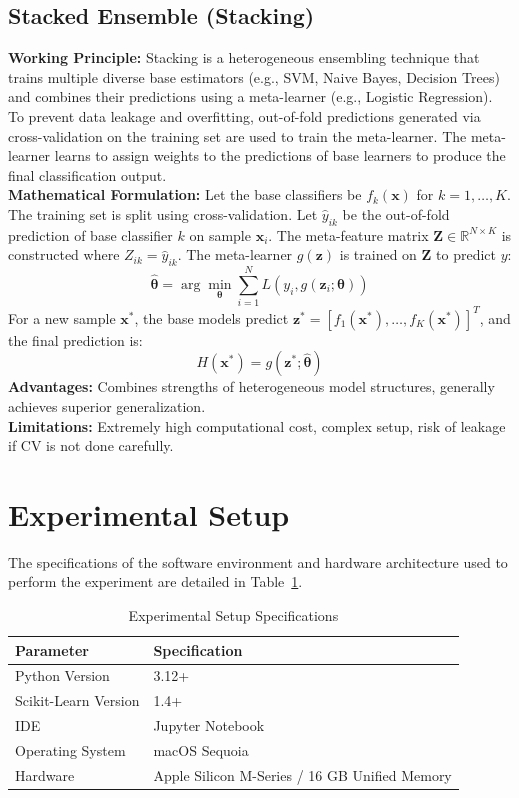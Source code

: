 \documentclass[12pt,a4paper]{article}
\begin{document}
\subsection{Stacked Ensemble (Stacking)}
\textbf{Working Principle:} Stacking is a heterogeneous ensembling technique that trains multiple diverse base estimators (e.g., SVM, Naive Bayes, Decision Trees) and combines their predictions using a meta-learner (e.g., Logistic Regression). To prevent data leakage and overfitting, out-of-fold predictions generated via cross-validation on the training set are used to train the meta-learner. The meta-learner learns to assign weights to the predictions of base learners to produce the final classification output.\\
\textbf{Mathematical Formulation:}
Let the base classifiers be $f_k(\mathbf{x})$ for $k = 1, \dots, K$. The training set is split using cross-validation. Let $\hat{y}_{ik}$ be the out-of-fold prediction of base classifier $k$ on sample $\mathbf{x}_i$. The meta-feature matrix $\mathbf{Z} \in \mathbb{R}^{N \times K}$ is constructed where $Z_{ik} = \hat{y}_{ik}$. The meta-learner $g(\mathbf{z})$ is trained on $\mathbf{Z}$ to predict $y$:
\begin{equation}
\hat{\boldsymbol{\theta}} = \arg\min_{\boldsymbol{\theta}} \sum_{i=1}^N L(y_i, g(\mathbf{z}_i; \boldsymbol{\theta}))
\end{equation}
For a new sample $\mathbf{x}^*$, the base models predict $\mathbf{z}^* = [f_1(\mathbf{x}^*), \dots, f_K(\mathbf{x}^*)]^T$, and the final prediction is:
\begin{equation}
H(\mathbf{x}^*) = g(\mathbf{z}^*; \hat{\boldsymbol{\theta}})
\end{equation}
\textbf{Advantages:} Combines strengths of heterogeneous model structures, generally achieves superior generalization.\\
\textbf{Limitations:} Extremely high computational cost, complex setup, risk of leakage if CV is not done carefully.

\section{Experimental Setup}
The specifications of the software environment and hardware architecture used to perform the experiment are detailed in Table~\ref{tab:exp_setup}.

\begin{table}[H]
\centering
\caption{Experimental Setup Specifications}
\label{tab:exp_setup}
\vspace{0.2cm}
\begin{tabular}{ll}
\toprule
\textbf{Parameter} & \textbf{Specification} \\
\midrule
Python Version & 3.12+ \\
Scikit-Learn Version & 1.4+ \\
IDE & Jupyter Notebook \\
Operating System & macOS Sequoia \\
Hardware & Apple Silicon M-Series / 16 GB Unified Memory \\
\bottomrule
\end{tabular}
\end{table}
\end{document}
